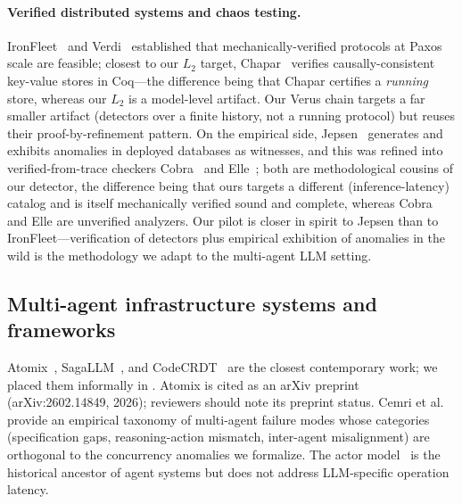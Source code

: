 \documentclass[journal,compsoc,10pt]{IEEEtran}
\providecommand{\citep}{\cite}
\theoremstyle{definition}
\theoremstyle{remark}
\begin{document}
\paragraph{Verified distributed systems and chaos testing.}
IronFleet~\citep{HawblitzelEtAl2015IronFleet} and
Verdi~\citep{WilcoxEtAl2015Verdi} established that mechanically-verified
protocols at Paxos scale are feasible; closest to our $L_2$ target,
Chapar~\citep{LesaniBellChlipala2016Chapar} verifies causally-consistent
key-value stores in Coq---the difference being that Chapar certifies a
\emph{running} store, whereas our $L_2$ is a model-level artifact. Our
Verus chain targets a far smaller artifact (detectors over a finite
history, not a running protocol) but reuses their proof-by-refinement
pattern. On the empirical side, Jepsen~\citep{Kingsbury2013Jepsen}
generates and exhibits anomalies in deployed databases as witnesses, and
this was refined into verified-from-trace checkers
Cobra~\citep{TanEtAl2020Cobra} and Elle~\citep{Aphyr2020Elle}; both are
methodological cousins of our detector, the difference being that ours
targets a different (inference-latency) catalog and is itself
mechanically verified sound and complete, whereas Cobra and Elle are
unverified analyzers. Our pilot is closer in spirit to Jepsen than to
IronFleet---verification of detectors plus empirical exhibition of
anomalies in the wild is the methodology we adapt to the multi-agent LLM
setting.

\subsection{Multi-agent infrastructure systems and frameworks}
\label{sec:related-multiagent}
Atomix~\citep{MohammadiEtAl2026Atomix},
SagaLLM~\citep{GengChang2025SagaLLM}, and
CodeCRDT~\citep{Pugachev2025CodeCRDT} are the closest contemporary
work; we placed them informally in .
Atomix is cited as an arXiv preprint (arXiv:2602.14849, 2026);
reviewers should note its preprint status.
Cemri et al.~\cite{CemriEtAl2025MAST} provide an empirical taxonomy of
multi-agent failure modes whose categories (specification gaps,
reasoning-action mismatch, inter-agent misalignment) are orthogonal
to the concurrency anomalies we formalize. The actor
model~\citep{Hewitt1973} is the historical ancestor of agent
systems but does not address LLM-specific operation latency.
\end{document}

